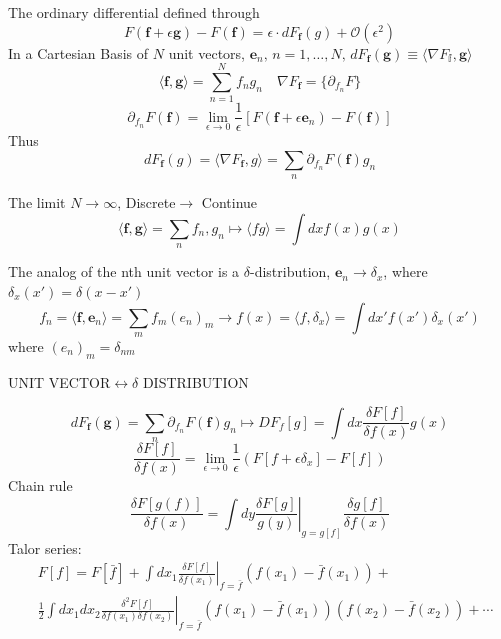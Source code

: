 \documentclass[a4paper,11pt]{article}
\begin{document}
The ordinary differential defined through
\begin{equation*}
  F(\mathbf{f}+\epsilon\mathbf{g})-F(\mathbf{f})=\epsilon\cdot dF_\mathbf{f}(g)+\mathcal{O}(\epsilon^2)
\end{equation*}
In a Cartesian Basis of $N$ unit vectors, $\mathbf{e}_n,\,n=1,\dots,N,\,dF_\mathbf{f}(\mathbf{g})\equiv\langle\nabla F_\mathbb{f},\mathbf{g}\rangle$
\begin{equation*}
  \langle\mathbf{f},\mathbf{g}\rangle=\sum_{n=1}^{N}f_ng_n\quad\nabla F_\mathbf{f}=\{\partial_{f_n}F\}
\end{equation*}
\begin{equation*}
  \partial_{f_n}F(\mathbf{f})=\lim_{\epsilon\to0}\frac{1}{\epsilon}[F(\mathbf{f}+\epsilon\mathbf{e}_n)-F(\mathbf{f})]
\end{equation*}
Thus
\begin{equation*}
  dF_{\mathbf{f}}(g)=\langle\nabla F_\mathbf{f},g\rangle=\sum_{n}\partial_{f_n}F(\mathbf{f})g_n
\end{equation*}
\begin{center}
  The limit $N\to\infty$, Discrete$\longrightarrow$ Continue
  \begin{equation*}
    \langle\mathbf{f},\mathbf{g}\rangle=\sum_{n}f_n,g_n\longmapsto\langle fg\rangle=\int dx f(x)g(x)
  \end{equation*}
\end{center}
The analog of the nth unit vector is a $\delta$-distribution, $\mathbf{e}_n\to\delta_x$, where $\delta_x(x')=\delta(x-x')$
\begin{equation*}
  f_n=\langle\mathbf{f},\mathbf{e}_n\rangle=\sum_{m}f_m(e_n)_m\to f(x)=\langle f,\delta_x\rangle=\int dx'f(x')\delta_x(x')
\end{equation*}
where $(e_n)_m=\delta_{nm}$
\begin{center}
  UNIT VECTOR$\longleftrightarrow\delta$ DISTRIBUTION
\end{center}
\begin{equation*}
  dF_\mathbf{f}(\mathbf{g})=\sum_{n}\partial_{f_n}F(\mathbf{f})g_n\longmapsto DF_f[g]=\int dx\frac{\delta F[f]}{\delta f(x)}g(x)
\end{equation*}
\begin{equation*}
  \frac{\delta F[f]}{\delta f(x)}=\lim_{\epsilon\to0}\frac{1}{\epsilon}\left(F[f+\epsilon\delta_x]-F[f]\right)
\end{equation*}
Chain rule
\begin{equation*}
  \frac{\delta F[g(f)]}{\delta f(x)}=\left.\int dy\frac{\delta F[g]}{g(y)}\right|_{g=g[f]}\frac{\delta g[f]}{\delta f(x)}
\end{equation*}
Talor series:
\begin{equation*}
  \begin{split}
     &\left.F[f]=F[\bar{f}]+\int dx_1\frac{\delta F[f]}{\delta f(x_1)}\right|_{f=\bar{f}}(f(x_1)-\bar{f}(x_1))+\\
       &\left.\frac{1}{2}\int dx_1dx_2\frac{\delta^2F[f]}{\delta f(x_1)\delta f(x_2)}\right|_{f=\bar{f}}(f(x_1)-\bar{f}(x_1))(f(x_2)-\bar{f}(x_2))+\cdots
  \end{split}
\end{equation*}
\end{document}
